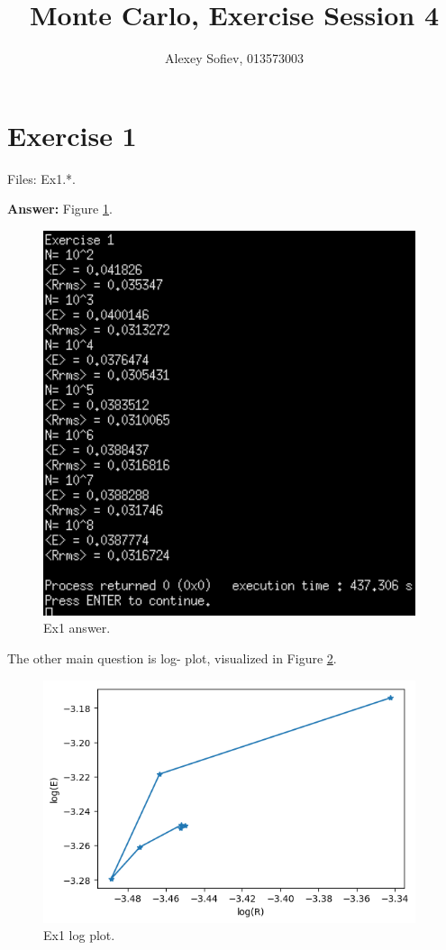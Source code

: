 \documentclass{article}
\begin{document}
\title{Monte Carlo, Exercise Session 4}
\author{Alexey Sofiev, 013573003}

\maketitle


\section{Exercise 1}
Files: Ex1.*. 

\textbf{Answer:} Figure \ref{fig:ex1_answer}.

\begin{figure}[!hbt]
	\centering
	\includegraphics[width=4.3in]{ex1_answer}
	\caption{Ex1 answer.}
	\label{fig:ex1_answer}
\end{figure}

The other main question is log- plot, visualized in Figure \ref{fig:ex1_log}.

\begin{figure}[!hbt]
	\centering
	\includegraphics[width=4.3in]{ex1_log}
	\caption{Ex1 log plot.}
	\label{fig:ex1_log}
\end{figure}
\end{document}
